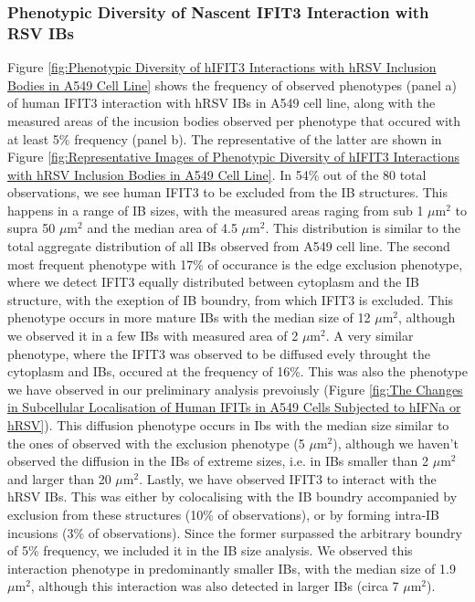 \subsubsection{Phenotypic Diversity of Nascent IFIT3 Interaction with RSV IBs}
Figure \ref{fig:Phenotypic Diversity of hIFIT3 Interactions with hRSV Inclusion Bodies in A549 Cell Line} shows the frequency of observed phenotypes (panel a) of human IFIT3 interaction with hRSV IBs in A549 cell line, along with the measured areas of the incusion bodies observed per phenotype that occured with at least 5\% frequency (panel b). The representative of the latter are shown in Figure \ref{fig:Representative Images of Phenotypic Diversity of hIFIT3 Interactions with hRSV Inclusion Bodies in A549 Cell Line}. In 54\% out of the 80 total observations, we see human IFIT3 to be excluded from the IB structures. This happens in a range of IB sizes, with the measured areas raging from sub 1 \(\mu \mbox{m}^2\) to supra 50 \(\mu \mbox{m}^2\) and the median area of 4.5 \(\mu \mbox{m}^2\). This distribution is similar to the total aggregate distribution of all IBs observed from A549 cell line. The second most frequent phenotype with 17\% of occurance is the edge exclusion phenotype, where we detect IFIT3 equally distributed between cytoplasm and the IB structure, with the exeption of IB boundry, from which IFIT3 is excluded. This phenotype occurs in more mature IBs with the median size of 12 \(\mu \mbox{m}^2\), although we observed it in a few IBs with measured area of 2 \(\mu \mbox{m}^2\). A very similar phenotype, where the IFIT3 was observed to be diffused evely throught the cytoplasm and IBs, occured at the frequency of 16\%. This was also the phenotype we have observed in our preliminary analysis prevoiusly (Figure \ref{fig:The Changes in Subcellular Localisation of Human IFITs in A549 Cells Subjected to hIFNa or hRSV}). This diffusion phenotype occurs in Ibs with the median size similar to the ones of observed with the exclusion phenotype (5 \(\mu \mbox{m}^2\)), although we haven't observed the diffusion in the IBs of extreme sizes, i.e. in IBs smaller than 2 \(\mu \mbox{m}^2\) and larger than 20 \(\mu \mbox{m}^2\). Lastly, we have observed IFIT3 to interact with the hRSV IBs. This was either by colocalising with the IB boundry accompanied by exclusion from these structures (10\% of observations), or by forming intra-IB incusions (3\% of observations). Since the former surpassed the arbitrary boundry of 5\% frequency, we included it in the IB size analysis. We observed this interaction phenotype in predominantly smaller IBs, with the median size of 1.9 \(\mu \mbox{m}^2\), although this interaction was also detected in larger IBs (circa 7 \(\mu \mbox{m}^2\)).


